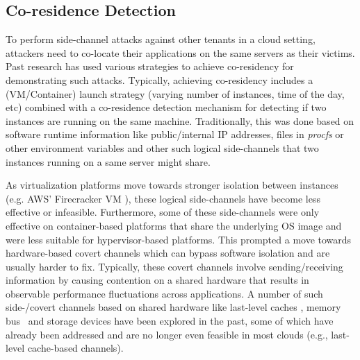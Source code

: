 \subsection{Co-residence Detection}
\label{sec:background:pastwork}

To perform side-channel attacks against other tenants in a cloud setting, attackers 
need to co-locate their applications on the same servers as their victims. Past 
research has used various strategies to achieve co-residency for demonstrating 
such attacks. Typically, achieving co-residency includes a (VM/Container) launch 
strategy (varying number of instances, time of the day, etc) combined with a 
co-residence detection mechanism 
for detecting if two instances are running on the same machine. Traditionally, 
this was done based on software runtime information like public/internal IP addresses\cite{ristenpartccs2009}, files in \textit{procfs} or other environment variables\cite{wangusenix2018} and other such logical side-channels\cite{varad191016,vmplacement}
that two instances running on a same server might share. 

As virtualization platforms move towards stronger isolation between instances 
(e.g. AWS' Firecracker VM \cite{firecracker}), these logical side-channels have 
become less effective or infeasible. Furthermore, some of these side-channels were only 
effective on container-based platforms that share the underlying OS image and were 
less suitable for hypervisor-based platforms. This prompted a move 
towards hardware-based covert channels which can bypass software isolation and are usually harder to fix. Typically, these covert channels involve 
sending/receiving information by causing contention on a shared hardware that 
results in observable performance fluctuations across applications. A 
number of such side-/covert channels based on shared hardware like last-level caches , memory bus~\cite{wuusenix2012,zhang2016,varadarajan2015} and 
storage devices have been explored in the past, some 
of which have already been addressed and are no longer even feasible in 
most clouds (e.g., last-level cache-based channels\cite{cache-sidechannels}). 


